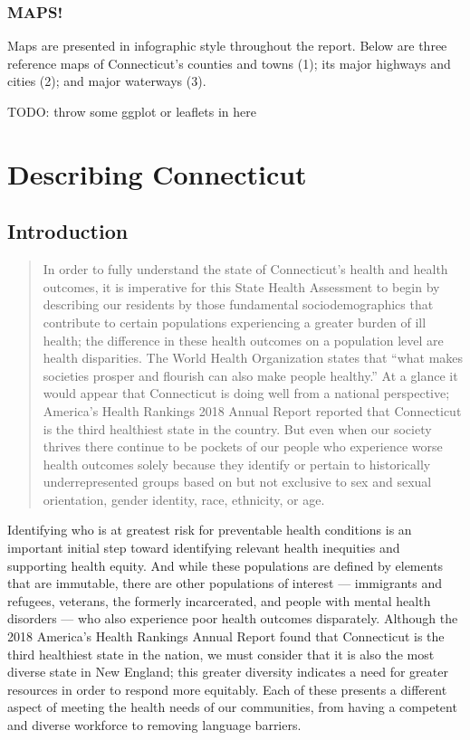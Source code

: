 \documentclass[
  letterpaper,
  DIV=11,
  numbers=noendperiod]{scrreprt}
\begin{document}
\section{MAPS!}\label{maps}

Maps are presented in infographic style throughout the report. Below are
three reference maps of Connecticut's counties and towns (1); its major
highways and cities (2); and major waterways (3).

TODO: throw some ggplot or leaflets in here

\part{Describing Connecticut}

\chapter{Introduction}\label{introduction}

\begin{quote}
In order to fully understand the state of Connecticut's health and
health outcomes, it is imperative for this State Health Assessment to
begin by describing our residents by those fundamental sociodemographics
that contribute to certain populations experiencing a greater burden of
ill health; the difference in these health outcomes on a population
level are health disparities. The World Health Organization states that
``what makes societies prosper and flourish can also make people
healthy.'' At a glance it would appear that Connecticut is doing well
from a national perspective; America's Health Rankings 2018 Annual
Report reported that Connecticut is the third healthiest state in the
country. But even when our society thrives there continue to be pockets
of our people who experience worse health outcomes solely because they
identify or pertain to historically underrepresented groups based on but
not exclusive to sex and sexual orientation, gender identity, race,
ethnicity, or age.
\end{quote}

Identifying who is at greatest risk for preventable health conditions is
an important initial step toward identifying relevant health inequities
and supporting health equity. And while these populations are defined by
elements that are immutable, there are other populations of interest ---
immigrants and refugees, veterans, the formerly incarcerated, and people
with mental health disorders --- who also experience poor health
outcomes disparately. Although the 2018 America's Health Rankings Annual
Report found that Connecticut is the third healthiest state in the
nation, we must consider that it is also the most diverse state in New
England; this greater diversity indicates a need for greater resources
in order to respond more equitably. Each of these presents a different
aspect of meeting the health needs of our communities, from having a
competent and diverse workforce to removing language barriers.
\end{document}
